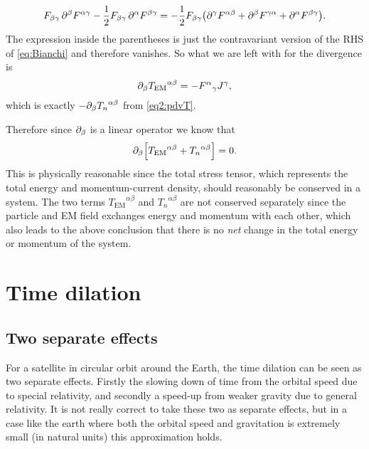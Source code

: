 \documentclass[11pt,a4paper, 
swedish, english %
]{article}
\newcommand{\EM}{\text{EM}}
\begin{document}
\begin{equation}
F_{\beta\gamma} \,\partial^\beta F^{\alpha\gamma}
-\frac{1}{2}F_{\beta\gamma}\,\partial^\alpha F^{\beta\gamma}=
-\frac{1}{2}F_{\beta\gamma}\qty( 
\partial^\gamma F^{\alpha\beta}
+\partial^\beta F^{\gamma\alpha}
+\partial^\alpha F^{\beta\gamma}).
\end{equation}
The expression inside the parentheses is just the contravariant version
of the RHS of \eqref{eq:Bianchi} and therefore vanishes.
So what we are left with for the divergence is
\begin{equation}
\pd_{\beta}{T_{\EM}}^{\alpha\beta}=-{F^{\alpha}}_\gamma J^\gamma,
\end{equation}
which is exactly $-\partial_\beta{T_n}^{\alpha\beta}$ from \eqref{eq2:pdvT}.

Therefore since $\partial_\beta$ is a linear operator we know that
\begin{equation}
\pd_{\beta}\qty[{T_{\EM}}^{\alpha\beta}+{T_n}^{\alpha\beta}]=0.
\end{equation}
This is physically reasonable since the total stress tensor, which
represents the total energy and momentum-current density, should
reasonably be conserved in a system. The two terms
${T_{\EM}}^{\alpha\beta}$ and ${T_n}^{\alpha\beta}$ are not conserved
separately since the particle and EM field exchanges energy and
momentum with each other, which also leads to the above conclusion
that there is no \emph{net} change in the total energy or momentum of
the system.





\renewcommand{\thesubsection}{\arabic{section} (\roman{subsection})}
\section{Time dilation}
\swapcommands{\phi}{\varphi}
\subsection{Two separate effects}
For a satellite in circular orbit around the Earth, 
the time dilation can be seen as two separate
effects. Firstly the slowing down of time from the orbital speed due
to special relativity, and secondly a speed-up from weaker gravity due
to general relativity. It is not really correct to take these two as
separate effects, but in a case like the earth where both the orbital
speed and gravitation is extremely small (in natural units) this
approximation holds.
\end{document}
